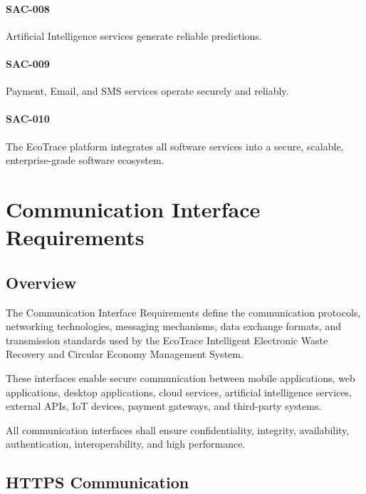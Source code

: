 \paragraph{SAC-008}

Artificial Intelligence services generate reliable predictions.

\paragraph{SAC-009}

Payment, Email, and SMS services operate securely and reliably.

\paragraph{SAC-010}

The EcoTrace platform integrates all software services into a secure,
scalable, enterprise-grade software ecosystem.

\section{Communication Interface Requirements}

\subsection{Overview}

The Communication Interface Requirements define the communication
protocols, networking technologies, messaging mechanisms, data exchange
formats, and transmission standards used by the EcoTrace Intelligent
Electronic Waste Recovery and Circular Economy Management System.

These interfaces enable secure communication between mobile
applications, web applications, desktop applications, cloud services,
artificial intelligence services, external APIs, IoT devices, payment
gateways, and third-party systems.

All communication interfaces shall ensure confidentiality, integrity,
availability, authentication, interoperability, and high performance.


\subsection{HTTPS Communication}

